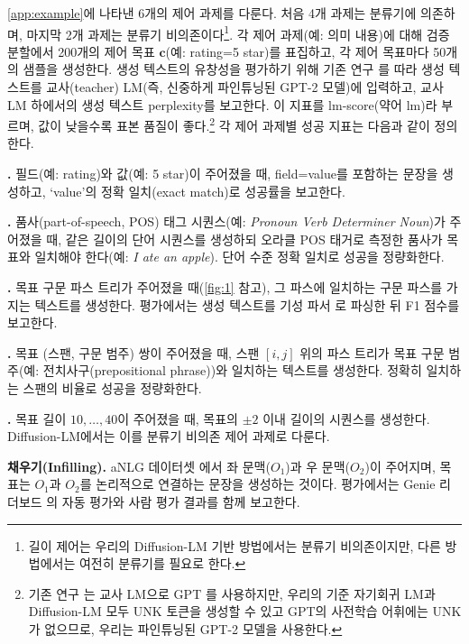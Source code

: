 \documentclass{article}
\newcommand{\expmb}[1]{\mathbf{#1}}
\newcommand{\cc}{\expmb{c}}
\begin{document}
\cref{app:example}에 나타낸 6개의 제어 과제를 다룬다. 처음 4개 과제는 분류기에 의존하며, 마지막 2개 과제는 분류기 비의존이다\footnote{길이 제어는 우리의 Diffusion-LM 기반 방법에서는 분류기 비의존이지만, 다른 방법에서는 여전히 분류기를 필요로 한다.}.
각 제어 과제(예: 의미 내용)에 대해 검증 분할에서 200개의 제어 목표 $\cc$(예: rating=5 star)를 표집하고, 각 제어 목표마다 50개의 샘플을 생성한다.
생성 텍스트의 유창성을 평가하기 위해 기존 연구 \cite{yang-klein-2021-fudge, Dathathri2020Plug}를 따라 생성 텍스트를 교사(teacher) LM(즉, 신중하게 파인튜닝된 GPT-2 모델)에 입력하고, 교사 LM 하에서의 생성 텍스트 perplexity를 보고한다. 이 지표를 lm-score(약어 lm)라 부르며, 값이 낮을수록 표본 품질이 좋다.\footnote{기존 연구 \cite{yang-klein-2021-fudge, Dathathri2020Plug}는 교사 LM으로 GPT \cite{Radford2018ImprovingLU}를 사용하지만, 우리의 기준 자기회귀 LM과 Diffusion-LM 모두 UNK 토큰을 생성할 수 있고 GPT의 사전학습 어휘에는 UNK가 없으므로, 우리는 파인튜닝된 GPT-2 모델을 사용한다.}
각 제어 과제별 성공 지표는 다음과 같이 정의한다.

\textbf{\Content.} 필드(예: rating)와 값(예: 5 star)이 주어졌을 때, field=value를 포함하는 문장을 생성하고, `value'의 정확 일치(exact match)로 성공률을 보고한다.




\textbf{\POS.} 품사(part-of-speech, POS) 태그 시퀀스(예: \textit{Pronoun Verb Determiner Noun})가 주어졌을 때, 같은 길이의 단어 시퀀스를 생성하되 오라클 POS 태거로 측정한 품사가 목표와 일치해야 한다(예: \textit{I ate an apple}). 단어 수준 정확 일치로 성공을 정량화한다.


\textbf{\Syntax.} 목표 구문 파스 트리가 주어졌을 때(\cref{fig:1} 참고), 그 파스에 일치하는 구문 파스를 가지는 텍스트를 생성한다. 평가에서는 생성 텍스트를 기성 파서 \cite{kitaev-klein-2018-constituency}로 파싱한 뒤 F1 점수를 보고한다.


\textbf{\Spans.} %
목표 (스팬, 구문 범주) 쌍이 주어졌을 때, 스팬 $[i,j]$ 위의 파스 트리가 목표 구문 범주(예: 전치사구(prepositional phrase))와 일치하는 텍스트를 생성한다. 정확히 일치하는 스팬의 비율로 성공을 정량화한다.


\textbf{\Length.} 목표 길이 $10, \dots, 40$이 주어졌을 때, 목표의 $\pm 2$ 이내 길이의 시퀀스를 생성한다. Diffusion-LM에서는 이를 분류기 비의존 제어 과제로 다룬다.

\textbf{채우기(Infilling).} aNLG 데이터셋 \cite{bhagavatula2020abductive}에서 좌 문맥($O_1$)과 우 문맥($O_2$)이 주어지며, 목표는 $O_1$과 $O_2$를 논리적으로 연결하는 문장을 생성하는 것이다. 평가에서는 Genie 리더보드 \cite{Khashabi2021GENIEAL}의 자동 평가와 사람 평가 결과를 함께 보고한다.
\end{document}

